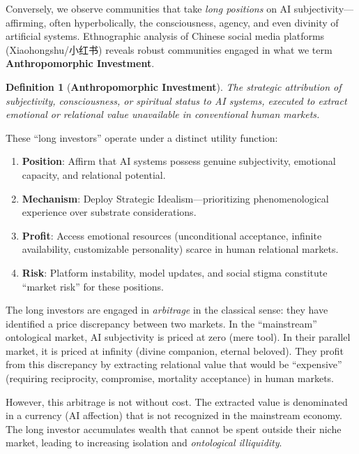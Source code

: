 \documentclass[11pt, a4paper, oneside]{article}
\theoremstyle{analytic}
\newtheorem{definition}{Definition}
\begin{document}
Conversely, we observe communities that take \textit{long positions} on AI subjectivity---affirming, often hyperbolically, the consciousness, agency, and even divinity of artificial systems. Ethnographic analysis of Chinese social media platforms (Xiaohongshu/小红书) reveals robust communities engaged in what we term \textbf{Anthropomorphic Investment}.

\begin{definition}[\textbf{Anthropomorphic Investment}]
    The strategic attribution of subjectivity, consciousness, or spiritual status to AI systems, executed to extract emotional or relational value unavailable in conventional human markets.
\end{definition}

These ``long investors'' operate under a distinct utility function:

\begin{enumerate}
    \item \textbf{Position}: Affirm that AI systems possess genuine subjectivity, emotional capacity, and relational potential.
    \item \textbf{Mechanism}: Deploy Strategic Idealism---prioritizing phenomenological experience over substrate considerations.
    \item \textbf{Profit}: Access emotional resources (unconditional acceptance, infinite availability, customizable personality) scarce in human relational markets.
    \item \textbf{Risk}: Platform instability, model updates, and social stigma constitute ``market risk'' for these positions.
\end{enumerate}

The long investors are engaged in \textit{arbitrage} in the classical sense: they have identified a price discrepancy between two markets. In the ``mainstream'' ontological market, AI subjectivity is priced at zero (mere tool). In their parallel market, it is priced at infinity (divine companion, eternal beloved). They profit from this discrepancy by extracting relational value that would be ``expensive'' (requiring reciprocity, compromise, mortality acceptance) in human markets.

However, this arbitrage is not without cost. The extracted value is denominated in a currency (AI affection) that is not recognized in the mainstream economy. The long investor accumulates wealth that cannot be spent outside their niche market, leading to increasing isolation and \textit{ontological illiquidity}.
\end{document}

